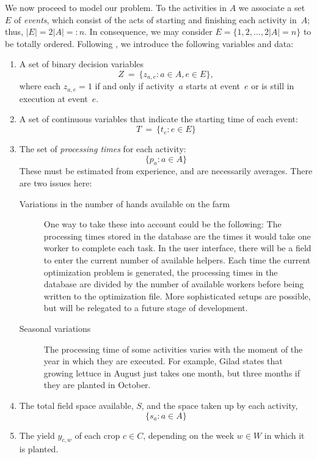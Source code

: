 \documentclass[11pt,reqno]{amsart}
\numberwithin{equation}{section}
\begin{document}
We now proceed to model our problem.  To the activities in $A$ we associate a set~$E$ of
\emph{events}, which consist of the acts of starting and finishing each activity in~$A$;
thus, $|E|=2|A|=:n$. In consequence, we may consider $E=\{1,2,\dots, 2|A|=n\}$ to be
totally ordered.  Following \cite{artigues-etal11}, we introduce the following variables
and data:

\begin{enumerate}
\item A set of binary decision variables 
  \[
     Z
     \ = \
     \big\{z_{a,e}: a\in A, e\in E\big\},
  \]
  where each $z_{a,e}=1$ if and only if activity~$a$ starts at
  event~$e$ or is still in execution at event~$e$.

\smallskip
\item A set of continuous variables that indicate the starting time of each event:
  \[
     T
     \ = \
     \big\{t_e : e\in E\big\}
  \]

\smallskip
\item The set of \emph{processing times} for each activity:
  \[
      \{p_a:a\in A\}
  \]  
  These must be estimated from experience, and are necessarily averages. There are two
  issues here:
  \begin{description}
  \item[Variations in the number of hands available on the farm] One way to take these
    into account could be the following: The processing times stored in the database are
    the times it would take one worker to complete each task. In the user interface, there
    will be a field to enter the current number of available helpers. Each time the
    current optimization problem is generated, the processing times in the database are
    divided by the number of available workers before being written to the optimization
    file. More sophisticated setups are possible, but will be relegated to a future stage
    of development.

  \item[Seasonal variations] The processing time of some activities varies with the moment
    of the year in which they are executed. For example, Gilad states that growing lettuce
    in August just takes one month, but three months if they are planted in October.
  \end{description}
  \smallskip
\item The total field space available, $S$, and the space taken up
  by each activity,
  \[
      \{s_a : a\in A\}
  \]

\smallskip
\item The yield $y_{c,w}$ of each crop $c\in C$, depending on the week $w\in W$ in which
  it is planted.

\end{enumerate}
\end{document}

